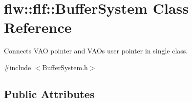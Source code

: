\hypertarget{structflw_1_1flf_1_1BufferSystem}{}\section{flw\+:\+:flf\+:\+:Buffer\+System Class Reference}
\label{structflw_1_1flf_1_1BufferSystem}


Connects V\+AO pointer and V\+AO\textquotesingle{}s user pointer in single class.  




{\ttfamily \#include $<$Buffer\+System.\+h$>$}

\subsection*{Public Attributes}
